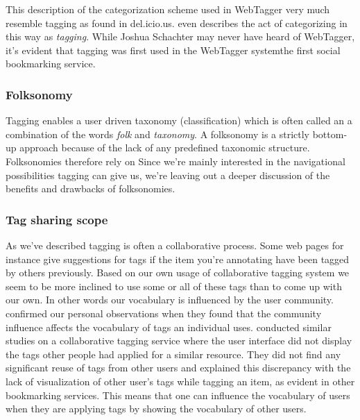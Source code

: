 This description of the categorization scheme used in WebTagger very much
resemble tagging as found in del.icio.us. \citeauthor{keller97} even describes
the act of categorizing in this way as \emph{tagging}. While Joshua Schachter
may never have heard of WebTagger, it's evident that tagging was first used in
the WebTagger system\dash{}the first social bookmarking service.

\subsubsection{Folksonomy}

Tagging enables a user driven taxonomy (classification)
which is often called an \dash{}a combination of the words
\emph{folk} and \emph{taxonomy}. A folksonomy is a strictly bottom-up
approach because of the lack of any predefined taxonomic structure.
Folksonomies therefore rely on 
Since we're mainly interested in the navigational possibilities tagging can
give us, we're leaving out a deeper discussion of the benefits and drawbacks
of folksonomies.%

\subsubsection{Tag sharing \oldand scope}
\label{section:social.navigation.applied.forms.tagging.sharing}

As we've described tagging is often a collaborative process. Some web pages
for instance give suggestions for tags if the item you're annotating have
been tagged by others previously. Based on our own usage of collaborative
tagging system we seem to be more inclined to use some or all of these tags
than to come up with our own. In other words our vocabulary is influenced
by the user community. \citet[]{sen06} confirmed our personal
observations when they found that the community influence affects the
vocabulary of tags an individual uses. \citet[]{farooq07} conducted
similar studies on a collaborative tagging service where the user interface
did not display the tags other people had applied for a similar resource.
They did not find any significant reuse of tags from other users and explained
this discrepancy with the lack of visualization of other user's tags while
tagging an item, as
evident in other bookmarking services. This means that one can influence
the vocabulary of users when they are applying tags by showing the
vocabulary of other users.

